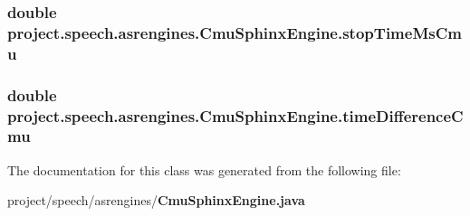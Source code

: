 \subsubsection[{stop\+Time\+Ms\+Cmu}]{\setlength{\rightskip}{0pt plus 5cm}double project.\+speech.\+asrengines.\+Cmu\+Sphinx\+Engine.\+stop\+Time\+Ms\+Cmu\hspace{0.3cm}{\ttfamily [private]}}\label{classproject_1_1speech_1_1asrengines_1_1_cmu_sphinx_engine_aabf9829bf6dc76e5b03ad6036f6d8f2a}
\subsubsection[{time\+Difference\+Cmu}]{\setlength{\rightskip}{0pt plus 5cm}double project.\+speech.\+asrengines.\+Cmu\+Sphinx\+Engine.\+time\+Difference\+Cmu\hspace{0.3cm}{\ttfamily [private]}}\label{classproject_1_1speech_1_1asrengines_1_1_cmu_sphinx_engine_a9b1762c8a6e85ef74223decef47a5ce4}


The documentation for this class was generated from the following file\+:\begin{DoxyCompactItemize}
\item 
project/speech/asrengines/{\bf Cmu\+Sphinx\+Engine.\+java}\end{DoxyCompactItemize}

